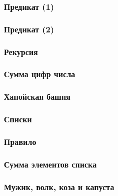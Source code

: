 \subsubsection{Предикат  (1)}


\subsubsection{Предикат  (2)}


\subsubsection{Рекурсия}


\subsubsection{Сумма цифр числа}


\subsubsection{Ханойская башня}


\subsubsection{Списки}


\subsubsection{Правило }


\subsubsection{Сумма элементов списка}


\subsubsection{Мужик, волк, коза и капуста}


